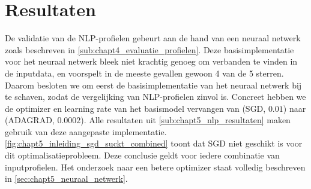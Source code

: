 \chapter{Resultaten}
De validatie van de NLP-profielen gebeurt aan de hand van een neuraal netwerk zoals beschreven in \autoref{sub:chapt4_evaluatie_profielen}. Deze basisimplementatie voor het neuraal netwerk bleek niet krachtig genoeg om verbanden te vinden in de inputdata, en voorspelt in de meeste gevallen gewoon 4 van de 5 sterren. Daarom besloten we om eerst de basisimplementatie van het neuraal netwerk bij te schaven, zodat de vergelijking van NLP-profielen zinvol is. Concreet hebben we de optimizer en learning rate van het basismodel vervangen van (SGD, $0.01$) naar (ADAGRAD, $0.0002$). Alle resultaten uit \autoref{sub:chapt5_nlp_resultaten} maken gebruik van deze aangepaste implementatie.\newline
\autoref{fig:chapt5_inleiding_sgd_suckt_combined} toont dat SGD niet geschikt is voor dit optimalisatieprobleem. Deze conclusie geldt voor iedere combinatie van inputprofielen. Het onderzoek naar een betere optimizer staat volledig beschreven in \autoref{sec:chapt5_neuraal_netwerk}.

